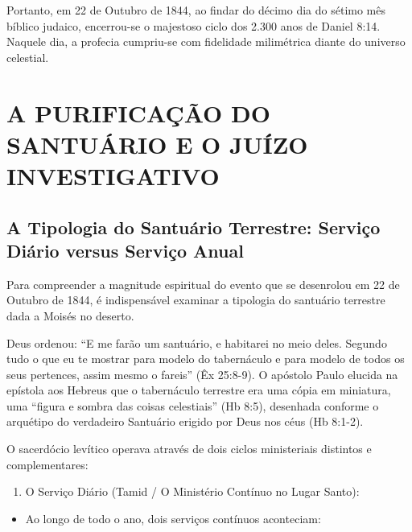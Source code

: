 Portanto, em 22 de Outubro de 1844, ao findar do décimo dia do sétimo mês bíblico judaico, encerrou-se o majestoso ciclo dos 2.300 anos de Daniel 8:14. Naquele dia, a profecia cumpriu-se com fidelidade milimétrica diante do universo celestial.



\section{A PURIFICAÇÃO DO SANTUÁRIO E O JUÍZO INVESTIGATIVO}



\subsection{A Tipologia do Santuário Terrestre: Serviço Diário versus Serviço Anual}


Para compreender a magnitude espiritual do evento que se desenrolou em 22 de Outubro de 1844, é indispensável examinar a tipologia do santuário terrestre dada a Moisés no deserto.

Deus ordenou: ``E me farão um santuário, e habitarei no meio deles. Segundo tudo o que eu te mostrar para modelo do tabernáculo e para modelo de todos os seus pertences, assim mesmo o fareis'' (Êx 25:8-9). O apóstolo Paulo elucida na epístola aos Hebreus que o tabernáculo terrestre era uma cópia em miniatura, uma ``figura e sombra das coisas celestiais'' (Hb 8:5), desenhada conforme o arquétipo do verdadeiro Santuário erigido por Deus nos céus (Hb 8:1-2).

O sacerdócio levítico operava através de dois ciclos ministeriais distintos e complementares:

\begin{enumerate}
  \item O Serviço Diário (Tamid / O Ministério Contínuo no Lugar Santo):
\end{enumerate}

\begin{itemize}
  \item Ao longo de todo o ano, dois serviços contínuos aconteciam:
\end{itemize}

